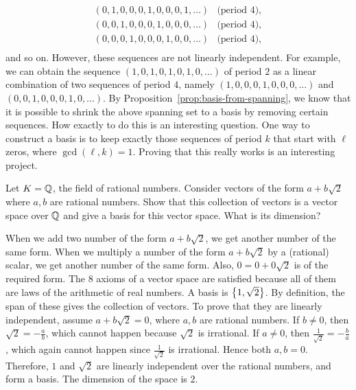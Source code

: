 \begin{ex}
\begin{sol}
\begin{enumerate}
\begin{equation*}
\begin{array}{ll}
          (0,1,0,0,0,1,0,0,0,1,\ldots) & \mbox{(period $4$)}, \\
          (0,0,1,0,0,0,1,0,0,0,\ldots) & \mbox{(period $4$)}, \\
          (0,0,0,1,0,0,0,1,0,0,\ldots) & \mbox{(period $4$)}, \\
        \end{array}
      \end{equation*}
      and so on. However, these sequences are not linearly
      independent. For example, we can obtain the sequence
      $(1,0,1,0,1,0,1,0,\ldots)$ of period $2$ as a linear combination
      of two sequences of period $4$, namely
      $(1,0,0,0,1,0,0,0,\ldots)$ and $(0,0,1,0,0,0,1,0,\ldots)$. By
      Proposition~\ref{prop:basis-from-spanning}, we know that it is
      possible to shrink the above spanning set to a basis by removing
      certain sequences. How exactly to do this is an interesting
      question. One way to construct a basis is to keep exactly those
      sequences of period $k$ that start with $\ell$ zeros, where
      $\gcd(\ell,k)=1$. Proving that this really works is an
      interesting project.
    \end{enumerate}
  \end{sol}
\end{ex}

\begin{ex}
  Let $K=\mathbb{Q}$, the field of rational numbers. Consider vectors of the
  form $a+b\sqrt{2}$ where $a,b$ are rational numbers. Show that this
  collection of vectors is a vector space over $\mathbb{Q}$ and give a basis
  for this vector space. What is its dimension?
  \begin{sol}
    When we add two number of the form $a+b\sqrt{2}$, we get another
    number of the same form. When we multiply a number of the form
    $a+b\sqrt{2}$ by a (rational) scalar, we get another number of the
    same form. Also, $0=0+0\sqrt{2}$ is of the required form. The 8
    axioms of a vector space are satisfied because all of them are
    laws of the arithmetic of real numbers. A basis is
    $\left\{1,\sqrt{2}\right\}$. By definition, the span of these gives the
    collection of vectors. To prove that they are linearly
    independent, assume $a+b\sqrt{2}=0$, where $a,b$ are rational
    numbers. If $b\neq 0$, then $\sqrt{2}=-\frac{a}{b}$, which cannot
    happen because $\sqrt{2}$ is irrational. If $a\neq 0$, then
    $\frac{1}{\sqrt{2}}=-\frac{b}{a}$, which again cannot happen since
    $\frac{1}{\sqrt{2}}$ is irrational. Hence both $a,b=0$. Therefore,
    $1$ and $\sqrt{2}$ are linearly independent over the rational
    numbers, and form a basis. The dimension of the space is $2$.
  \end{sol}
\end{ex}
